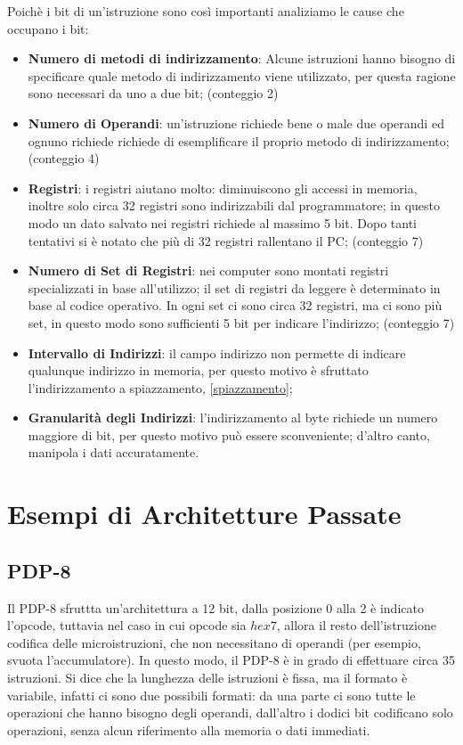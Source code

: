 \documentclass{article}
\begin{document}
Poichè i bit di un'istruzione sono così importanti analiziamo le cause che occupano i bit:
\begin{itemize}
	\item \textbf{Numero di metodi di indirizzamento}:  Alcune istruzioni hanno bisogno di specificare quale metodo di indirizzamento viene utilizzato, per questa ragione sono necessari da uno a due bit; (conteggio 2)

	\item \textbf{Numero di Operandi}: un'istruzione richiede bene o male due operandi ed ognuno richiede richiede di esemplificare il proprio metodo di indirizzamento; (conteggio 4)

	\item \textbf{Registri}: i registri aiutano molto: diminuiscono gli accessi in memoria, inoltre solo circa 32 registri sono indirizzabili dal programmatore; in questo modo un dato salvato nei registri richiede al massimo 5 bit. Dopo tanti tentativi si è notato che più di 32 registri rallentano il PC; (conteggio 7)

	\item \textbf{Numero di Set di Registri}: nei computer sono montati registri specializzati in base all'utilizzo; il set di registri da leggere è determinato in base al codice operativo. In ogni set ci sono circa 32 registri, ma ci sono più set, in questo modo sono sufficienti 5 bit per indicare l'indirizzo; (conteggio 7)

	\item \textbf{Intervallo di Indirizzi}: il campo indirizzo non permette di indicare qualunque indirizzo in memoria, per questo motivo è sfruttato l'indirizzamento a spiazzamento, \autoref{spiazzamento};

	\item \textbf{Granularità degli Indirizzi}: l'indirizzamento al byte richiede un numero maggiore di bit, per questo motivo può essere sconveniente; d'altro canto, manipola i dati accuratamente.
\end{itemize}

\section{Esempi di Architetture Passate}
\subsection{PDP-8}

Il PDP-8 sfruttta un'architettura a 12 bit, dalla posizione 0 alla 2 è indicato l'opcode, tuttavia nel caso in cui opcode sia $hex7$, allora il resto dell'istruzione codifica delle microistruzioni, che non necessitano di operandi (per esempio, svuota l'accumulatore). In questo modo, il PDP-8 è in grado di effettuare circa 35 istruzioni. Si dice che la lunghezza delle istruzioni è fissa, ma il formato è variabile, infatti ci sono due possibili formati: da una parte ci sono tutte le operazioni che hanno bisogno degli operandi, dall'altro i dodici bit codificano solo operazioni, senza alcun riferimento alla memoria o dati immediati.
\end{document}
